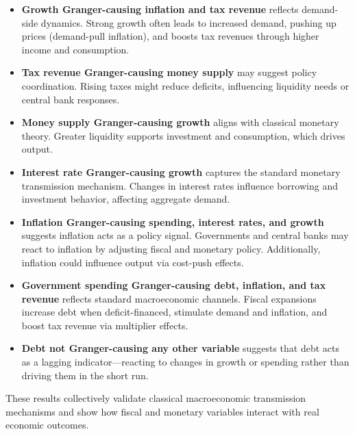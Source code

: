 \documentclass[a4paper,12pt]{article}
\begin{document}
\begin{itemize}
  \item \textbf{Growth Granger-causing inflation and tax revenue} reflects demand-side dynamics. Strong growth often leads to increased demand, pushing up prices (demand-pull inflation), and boosts tax revenues through higher income and consumption.
  
  \item \textbf{Tax revenue Granger-causing money supply} may suggest policy coordination. Rising taxes might reduce deficits, influencing liquidity needs or central bank responses.

  \item \textbf{Money supply Granger-causing growth} aligns with classical monetary theory. Greater liquidity supports investment and consumption, which drives output.

  \item \textbf{Interest rate Granger-causing growth} captures the standard monetary transmission mechanism. Changes in interest rates influence borrowing and investment behavior, affecting aggregate demand.

  \item \textbf{Inflation Granger-causing spending, interest rates, and growth} suggests inflation acts as a policy signal. Governments and central banks may react to inflation by adjusting fiscal and monetary policy. Additionally, inflation could influence output via cost-push effects.

  \item \textbf{Government spending Granger-causing debt, inflation, and tax revenue} reflects standard macroeconomic channels. Fiscal expansions increase debt when deficit-financed, stimulate demand and inflation, and boost tax revenue via multiplier effects.

  \item \textbf{Debt not Granger-causing any other variable} suggests that debt acts as a lagging indicator—reacting to changes in growth or spending rather than driving them in the short run.
\end{itemize}

These results collectively validate classical macroeconomic transmission mechanisms and show how fiscal and monetary variables interact with real economic outcomes.

\section{}
\end{document}

